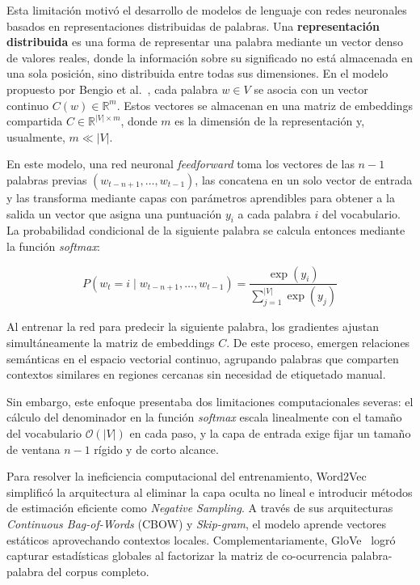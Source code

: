 Esta limitación motivó el desarrollo de modelos de lenguaje con redes neuronales basados en representaciones distribuidas de palabras. Una \textbf{representación distribuida} es una forma de representar una palabra mediante un vector denso de valores reales, donde la información sobre su significado no está almacenada en una sola posición, sino distribuida entre todas sus dimensiones. En el modelo propuesto por Bengio et al.~\cite{bengio2003}, cada palabra $w \in V$ se asocia con un vector continuo $C(w) \in \mathbb{R}^m$. Estos vectores se almacenan en una matriz de embeddings compartida $C \in \mathbb{R}^{\lvert V\rvert \times m}$, donde $m$ es la dimensión de la representación y, usualmente, $m \ll \lvert V\rvert$.

En este modelo, una red neuronal \textit{feedforward} toma los vectores de las $n-1$ palabras previas $(w_{t-n+1}, \ldots, w_{t-1})$, las concatena en un solo vector de entrada y las transforma mediante capas con parámetros aprendibles para obtener a la salida un vector que asigna una puntuación $y_i$ a cada palabra $i$ del vocabulario. La probabilidad condicional de la siguiente palabra se calcula entonces mediante la función \textit{softmax}:

\[
P(w_t = i \mid w_{t-n+1}, \ldots, w_{t-1}) = \frac{\exp(y_i)}{\sum_{j=1}^{\lvert V\rvert} \exp(y_j)}
\]


Al entrenar la red para predecir la siguiente palabra, los gradientes ajustan simultáneamente la matriz de embeddings $C$. De este proceso, emergen relaciones semánticas en el espacio vectorial continuo, agrupando palabras que comparten contextos similares en regiones cercanas sin necesidad de etiquetado manual.

Sin embargo, este enfoque presentaba dos limitaciones computacionales severas: el cálculo del denominador en la función \textit{softmax} escala linealmente con el tamaño del vocabulario $\mathcal{O}(\lvert V\rvert)$ en cada paso, y la capa de entrada exige fijar un tamaño de ventana $n-1$ rígido y de corto alcance.

Para resolver la ineficiencia computacional del entrenamiento, Word2Vec~\cite{mikolov2013} simplificó la arquitectura al eliminar la capa oculta no lineal e introducir métodos de estimación eficiente como \textit{Negative Sampling}. A través de sus arquitecturas \textit{Continuous Bag-of-Words} (CBOW) y \textit{Skip-gram}, el modelo aprende vectores estáticos aprovechando contextos locales. Complementariamente, GloVe~\cite{pennington2014} logró capturar estadísticas globales al factorizar la matriz de co-ocurrencia palabra-palabra del corpus completo.

